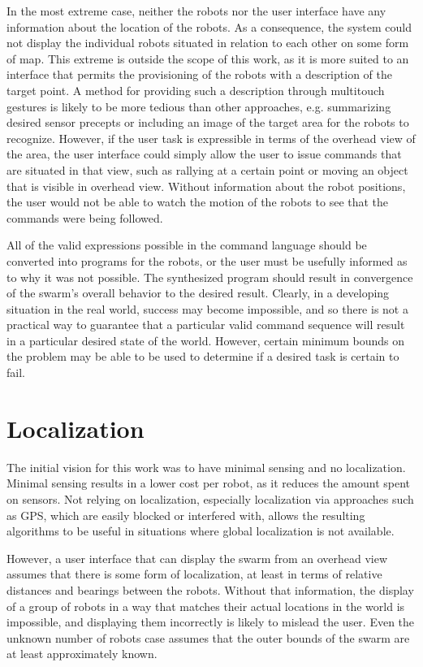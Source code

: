 In the most extreme case, neither the robots nor the user interface have any information about the location of the robots. 
As a consequence, the system could not display the individual robots situated in relation to each other on some form of map. 
This extreme is outside the scope of this work, as it is more suited to an interface that permits the provisioning of the robots with a description of the target point. 
A method for providing such a description through multitouch gestures is likely to be more tedious than other approaches, e.g. summarizing desired sensor precepts or including an image of the target area for the robots to recognize. 
However, if the user task is expressible in terms of the overhead view of the area, the user interface could simply allow the user to issue commands that are situated in that view, such as rallying at a certain point or moving an object that is visible in overhead view. 
Without information about the robot positions, the user would not be able to watch the motion of the robots to see that the commands were being followed. 

All of the valid expressions possible in the command language should be converted into programs for the robots, or the user must be usefully informed as to why it was not possible. 
The synthesized program should result in convergence of the swarm's overall behavior to the desired result. 
Clearly, in a developing situation in the real world, success may become impossible, and so there is not a practical way to guarantee that a particular valid command sequence will result in a particular desired state of the world. 
However, certain minimum bounds on the problem may be able to be used to determine if a desired task is certain to fail. 

\section{Localization}

The initial vision for this work was to have minimal sensing and no localization. 
Minimal sensing results in a lower cost per robot, as it reduces the amount spent on sensors. 
Not relying on localization, especially localization via approaches such as GPS, which are easily blocked or interfered with, allows the resulting algorithms to be useful in situations where global localization is not available. 

However, a user interface that can display the swarm from an overhead view assumes that there is some form of localization, at least in terms of relative distances and bearings between the robots.
Without that information, the display of a group of robots in a way that matches their actual locations in the world is impossible, and displaying them incorrectly is likely to mislead the user. 
Even the unknown number of robots case assumes that the outer bounds of the swarm are at least approximately known. 

